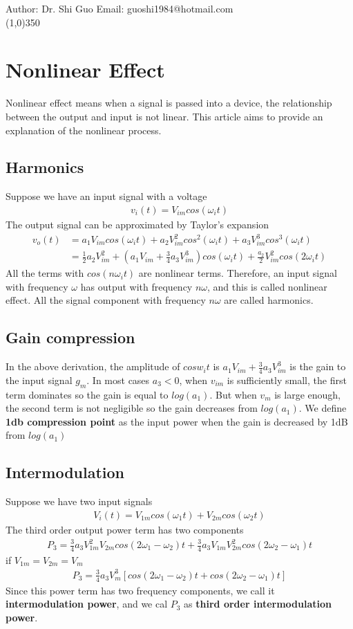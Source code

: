 \documentclass[a4paper]{article}
\begin{document}
Author: Dr. Shi Guo  \hspace{30mm} Email: guoshi1984@hotmail.com\\
\line(1,0){350}
\section{Nonlinear Effect}
Nonlinear effect means when a signal is passed into a device, the relationship between the output and input is not linear. This article aims to provide an explanation of the nonlinear process.
\subsection{Harmonics}
Suppose we have an input signal with a voltage 
\begin{align*}
	v_i(t) = V_{im} cos (\omega_i t)
\end{align*}
The output  signal can be approximated by Taylor's expansion
\begin{align*}
	v_o(t) & = a_1 V_{im} cos(\omega_i t) + a_2 V^2_{im} cos^2(\omega_i t) + a_3 V^3_{im} cos^3(\omega_i t)\\
	     & = \frac{1}{2} a_2 V^2_{im} +(a_1 V_{im} + \frac{3}{4} a_3 V^3_{im}) cos(\omega_i t) + \frac{a_2}{2} V^2_{im} cos(2\omega_i t) 
\end{align*}
All the terms with $cos(n \omega_i t) $ are nonlinear terms. Therefore, an input signal with frequency $\omega$  has output with frequency $n \omega$, and this is called nonlinear effect. All the signal component with frequency $n \omega$ are called harmonics.
\subsection{Gain compression}
In the above derivation, the amplitude of $cos w_i t$ is $a_1 V_{im} + \frac{3}{4} a_3 V^3_{im}$ is the gain to the input signal $g_m$. In most cases $a_3 < 0$, when $v_{im}$ is sufficiently small, the first term dominates so the gain is equal to $log(a_1)$. But when $v_m$ is large enough, the second term is not negligible so the gain decreases from $log(a_1)$. We define {\bf 1db compression point} as the input power when the gain is decreased by 1dB from $log(a_1)$
\subsection{Intermodulation}
Suppose we have two input signals
\begin{align*}
	V_i(t) = V_{1m} cos(\omega_1 t) + V_{2m} cos(\omega_2 t)
\end{align*}
The third order output power term has two components 
\begin{align*}
	P_3 = \frac{3}{4}a_3 V^2_{1m}V_{2m}cos(2\omega_1 - \omega_2)t + \frac{3}{4}a_3 V_{1m}V^2_{2m} cos(2\omega_2 - \omega_1)t
\end{align*}
if $V_{1m} = V_{2m} = V_m$
\begin{align*}
	P_3 = \frac{3}{4}a_3 V^3_{m}[cos(2\omega_1 - \omega_2)t +  cos(2\omega_2 - \omega_1)t]
\end{align*}
Since this power term has two frequency components, we call it {\bf intermodulation power}, and we cal $P_3$ as {\bf third order intermodulation power}.
\end{document}
